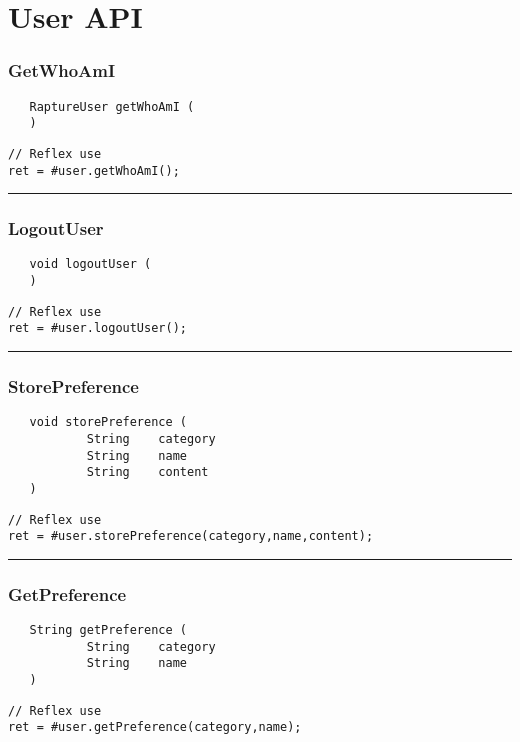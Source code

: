 \section{User API}

\subsubsection{GetWhoAmI}
\label{Api:GetWhoAmI}
\begin{verbatim}
   RaptureUser getWhoAmI (
   )
\end{verbatim}
\begin{lstlisting}[language=reflex]
// Reflex use
ret = #user.getWhoAmI();
\end{lstlisting}



\rule{15cm}{2pt}
\subsubsection{LogoutUser}
\label{Api:LogoutUser}
\begin{verbatim}
   void logoutUser (
   )
\end{verbatim}
\begin{lstlisting}[language=reflex]
// Reflex use
ret = #user.logoutUser();
\end{lstlisting}



\rule{15cm}{2pt}
\subsubsection{StorePreference}
\label{Api:StorePreference}
\begin{verbatim}
   void storePreference (
           String    category
           String    name
           String    content
   )
\end{verbatim}
\begin{lstlisting}[language=reflex]
// Reflex use
ret = #user.storePreference(category,name,content);
\end{lstlisting}



\rule{15cm}{2pt}
\subsubsection{GetPreference}
\label{Api:GetPreference}
\begin{verbatim}
   String getPreference (
           String    category
           String    name
   )
\end{verbatim}
\begin{lstlisting}[language=reflex]
// Reflex use
ret = #user.getPreference(category,name);
\end{lstlisting}



